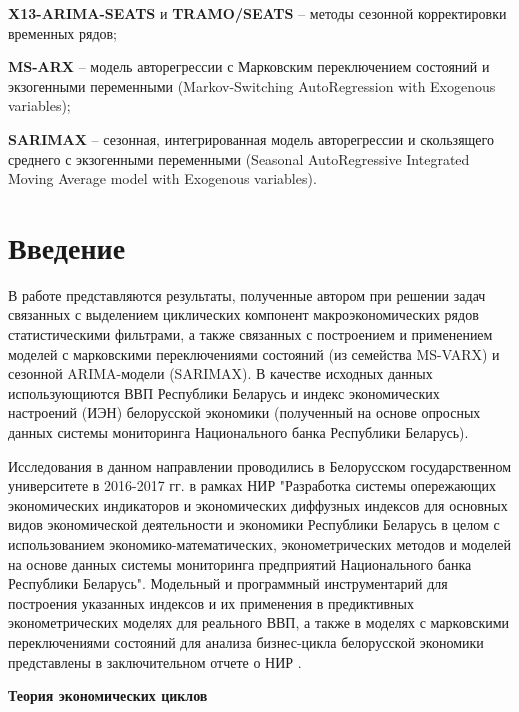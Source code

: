 \documentclass[a4paper,14pt]{extreport}
\begin{document}
	\textbf{X13-ARIMA-SEATS} и \textbf{TRAMO/SEATS} -- методы сезонной корректировки временных рядов;
	
	\textbf{MS-ARX} -- модель авторегрессии с Марковским переключением состояний и экзогенными переменными (Markov-Switching AutoRegression with Exogenous variables);
	
	\textbf{SARIMAX} -- сезонная, интегрированная модель авторегрессии и скользящего среднего с экзогенными переменными (Seasonal AutoRegressive Integrated Moving Average model with Exogenous variables).
	
	\clearpage
	
	
	\chapter*{Введение}
	В работе представляются результаты, полученные автором при решении задач связанных с выделением циклических компонент макроэкономических рядов статистическими фильтрами, а также связанных с построением и применением моделей с марковскими переключениями состояний (из семейства MS-VARX) и сезонной ARIMA-модели (SARIMAX).	В качестве исходных данных использующиются ВВП Республики Беларусь и индекс экономических настроений (ИЭН) белорусской экономики (полученный на основе опросных данных системы мониторинга Национального банка Республики Беларусь). 
		
	Исследования в данном направлении проводились в Белорусском государственном университете в 2016-2017 гг. в рамках НИР "Разработка системы опережающих экономических индикаторов и экономических диффузных индексов для основных видов экономической деятельности и экономики Республики Беларусь в целом с использованием экономико-математических, эконометрических методов и моделей на основе данных системы мониторинга предприятий Национального банка Республики Беларусь". Модельный и программный инструментарий для построения указанных  индексов и их применения в предиктивных эконометрических моделях для реального ВВП, а также в моделях с марковскими переключениями состояний для анализа бизнес-цикла белорусской экономики представлены в заключительном отчете о НИР \cite{esiMaking}.
	
	\bigskip
	\textbf{Теория экономических циклов}
	
\end{document}
